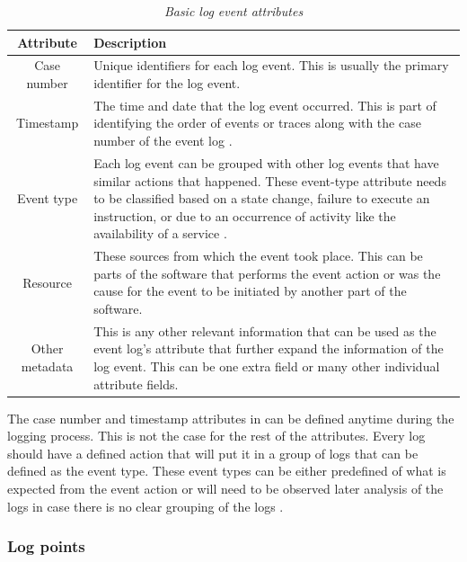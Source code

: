 \begin{table}[!htb]
	\centering
	\caption[Basic log event attributes]
	{\textit{Basic log event attributes \cite{Bekeneva2020}}}
	\label{tbl:ch1_logBasicAttributes}
	\begin{tabularx}{\textwidth}{|c|X|}
		\hline \textbf{Attribute} & \textbf{Description} \\
		\hline Case number & Unique identifiers for each log event. This is usually the primary identifier for the log event. \\
		\hline Timestamp & The time and date that the log event occurred. This is part of identifying the order of events or traces along with the case number of the event log \cite{Kherbouche2017}. \\
		\hline Event type & Each log event can be grouped with other log events that have similar actions that happened. These event-type attribute needs to be classified based on a state change, failure to execute an instruction, or due to an occurrence of activity like the availability of a service \cite{Fedaghi2010}. \\
		\hline Resource & These sources from which the event took place. This can be parts of the software that performs the event action or was the cause for the event to be initiated by another part of the software. \\
		\hline Other metadata & This is any other relevant information that can be used as the event log's attribute that further expand the information of the log event. This can be one extra field or many other individual attribute fields.\\
		\hline
	\end{tabularx}
\end{table}

The case number and timestamp attributes in  can be defined anytime during the logging process. This is not the case for the rest of the attributes. Every log should have a defined action that will put it in a group of logs that can be defined as the event type. These event types can be either predefined of what is expected from the event action or will need to be observed later analysis of the logs in case there is no clear grouping of the logs \cite{Bekeneva2020, Fedaghi2010}.

\subsubsection{Log points}

